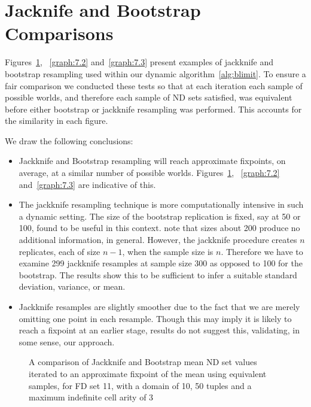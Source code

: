 \section{Jacknife and Bootstrap Comparisons}

Figures~\ref{graph:7.1}, ~\ref{graph:7.2} and~\ref{graph:7.3} present
examples of jackknife and bootstrap resampling used within our dynamic
algorithm~\ref{alg:blimit}. To ensure a fair comparison we conducted
these tests so that at each iteration each sample of possible worlds,
and therefore each sample of ND sets satisfied, was equivalent before
either bootstrap or jackknife resampling was performed. This accounts
for the similarity in each figure.

We draw the following conclusions:
\begin{itemize}
\item Jackknife and Bootstrap resampling will reach approximate
fixpoints, on average, at a similar number of possible
worlds. Figures~\ref{graph:7.1}, ~\ref{graph:7.2} and~\ref{graph:7.3}
are indicative of this. 
\item The jackknife resampling technique is more computationally
intensive in such a dynamic setting. The size of the bootstrap
replication is fixed, say at 50 or 100, found to be useful in this
context. \cite{et86,et93} note that sizes about 200 produce no
additional information, in general. However, the jackknife procedure
creates $n$ replicates, each of size $n-1$, when the sample size is
$n$. Therefore we have to examine 299 jackknife resamples at sample
size 300 as opposed to 100 for the bootstrap. The results show this to
be sufficient to infer a suitable standard deviation, variance, or
mean.
\item Jackknife resamples are slightly smoother due to the fact that
we are merely omitting one point in each resample. Though this may
imply it is likely to reach a fixpoint at an earlier stage, results do
not suggest this, validating, in some sense, our approach.
\end{itemize}


\begin{figure}
\begin{minipage}{7cm}
\centerline{}
\end{minipage}
\hfill
\begin{minipage}{7cm}
\centerline{}
\end{minipage}
\caption{\label{graph:7.1} {A comparison of Jackknife and
Bootstrap mean ND set values iterated to an approximate fixpoint of
the mean using equivalent samples, for FD set 11, with a domain of 10,
50 tuples and a maximum indefinite cell arity of 3}}
\end{figure}


